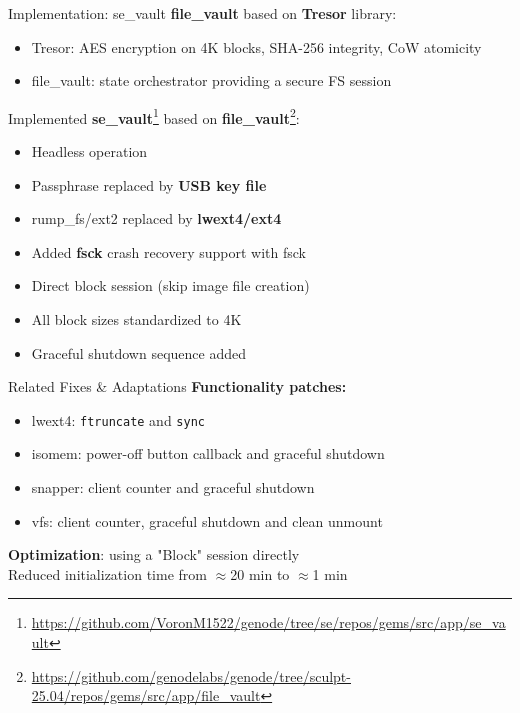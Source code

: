 \documentclass{beamer}
\begin{document}
\begin{frame}{Implementation: se\_vault}
    \textbf{file\_vault} based on \textbf{Tresor} library:
    \begin{itemize}
        \item Tresor: AES encryption on 4K blocks, SHA-256 integrity, CoW atomicity
        \item file\_vault: state orchestrator providing a secure FS session
    \end{itemize}

    \bigskip
    Implemented \textbf{se\_vault}\footnote{\url{https://github.com/VoronM1522/genode/tree/se/repos/gems/src/app/se_vault}}
    based on \textbf{file\_vault}\footnote{\url{https://github.com/genodelabs/genode/tree/sculpt-25.04/repos/gems/src/app/file_vault}}:
    \begin{itemize}
        \item Headless operation
        \item Passphrase replaced by \textbf{USB key file}
        \item rump\_fs/ext2 replaced by \textbf{lwext4/ext4}
        \item Added \textbf{fsck} crash recovery support with fsck
        \item Direct block session (skip image file creation)
        \item All block sizes standardized to 4K
        \item Graceful shutdown sequence added
    \end{itemize}
\end{frame}


\begin{frame}{Related Fixes \& Adaptations}
    \textbf{Functionality patches:}
    \begin{itemize}
        \item lwext4: \texttt{ftruncate} and \texttt{sync}
        \item isomem: power-off button callback and graceful shutdown
        \item snapper: client counter and graceful shutdown
        \item vfs: client counter, graceful shutdown and clean unmount
    \end{itemize}

    \bigskip
    \textbf{Optimization}: using a "Block" session directly\\
    Reduced initialization time from $\approx$20 min to $\approx$1 min
\end{frame}
\end{document}
